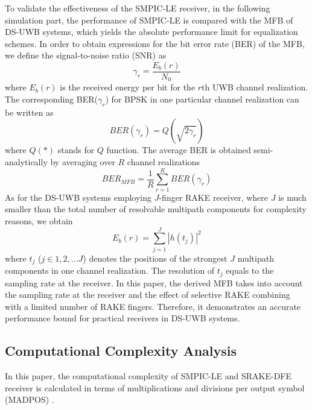 \documentclass[journal]{IEEEtran}
\begin{document}
To validate the effectiveness of the SMPIC-LE receiver, in the
following simulation part, the performance of SMPIC-LE is compared
with the MFB of DS-UWB systems, which yields the absolute
performance limit for equalization schemes. In order to obtain
expressions for the bit error rate (BER) of the MFB, we define the
signal-to-noise ratio (SNR) as
\begin{equation}
\label{MFB_SNR} \gamma_r = \frac{E_b(r)}{N_0}
\end{equation}
where $E_b(r)$ is the received energy per bit for the $r$th UWB
channel realization. The corresponding BER($\gamma_r$) for BPSK in
one particular channel realization can be written as
\begin{equation}
\label{MFB_BER} BER(\gamma_r) = Q(\sqrt{2\gamma_r})
\end{equation}
where $Q(*)$ stands for $Q$ function. The average BER is obtained
semi-analytically by averaging over $R$ channel realizations
\begin{equation}
\label{MFB_BER_aver} BER_{MFB} =
\frac{1}{R}\sum_{r=1}^RBER(\gamma_r)
\end{equation}
As for the DS-UWB systems employing $J$-finger RAKE receiver, where
$J$ is much smaller than the total number of resolvable multipath
components for complexity reasons, we obtain
\begin{equation}
\label{MFB_Eb} E_b(r) = \sum_{j=1}^J |h(t_j)|^2
\end{equation}
where $t_j$ ($j\in{1,2,...J}$) denotes the positions of the
strongest $J$ multipath components in one channel realization. The
resolution of $t_j$ equals to the sampling rate at the receiver. In
this paper, the derived MFB takes into account the sampling rate at
the receiver and the effect of selective RAKE combining with a
limited number of RAKE fingers. Therefore, it demonstrates an
accurate performance bound for practical receivers in DS-UWB
systems.

\subsection{Computational Complexity Analysis}




In this paper, the computational complexity of SMPIC-LE and
SRAKE-DFE receiver is calculated in terms of multiplications and
divisions per output symbol (MADPOS) \cite{Proakis}.
\end{document}

